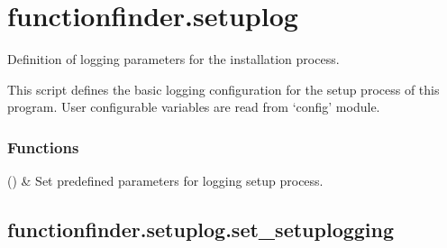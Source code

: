 \documentclass[letterpaper,10pt,english]{sphinxmanual}
\begin{document}
\sphinxstepscope


\section{functionfinder.setuplog}
\label{\detokenize{_autosummary/functionfinder.setuplog:module-functionfinder.setuplog}}\label{\detokenize{_autosummary/functionfinder.setuplog:functionfinder-setuplog}}\label{\detokenize{_autosummary/functionfinder.setuplog::doc}}
\sphinxAtStartPar
Definition of logging parameters for the installation process.

\sphinxAtStartPar
This script defines the basic logging configuration for the setup process of
this program. User configurable variables are read from ‘config’ module.
\subsubsection*{Functions}


\begin{savenotes}\sphinxattablestart
\sphinxthistablewithglobalstyle
\sphinxthistablewithnovlinesstyle
\centering
\begin{tabulary}{\linewidth}[t]{}
\sphinxtoprule
\sphinxtableatstartofbodyhook
\sphinxAtStartPar
{\hyperref[\detokenize{_autosummary/functionfinder.setuplog.set_setuplogging:functionfinder.setuplog.set_setuplogging}]{}}()
&
\sphinxAtStartPar
Set predefined parameters for logging setup process.
\\
\sphinxbottomrule
\end{tabulary}
\sphinxtableafterendhook\par
\sphinxattableend\end{savenotes}

\sphinxstepscope


\subsection{functionfinder.setuplog.set\_setuplogging}
\label{\detokenize{_autosummary/functionfinder.setuplog.set_setuplogging:functionfinder-setuplog-set-setuplogging}}\label{\detokenize{_autosummary/functionfinder.setuplog.set_setuplogging::doc}}
\end{document}
